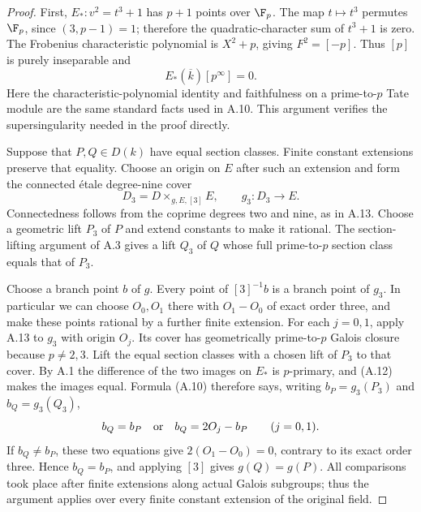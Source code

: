 \begin{proof}
First, $E_*:v^2=t^3+1$ has $p+1$ points over $\F_p$.
The map $t\mapsto t^3$ permutes $\F_p$, since $(3,p-1)=1$;
therefore the quadratic-character sum of $t^3+1$ is zero.
The Frobenius characteristic polynomial is $X^2+p$, giving
$F^2=[-p]$. Thus $[p]$ is purely inseparable and
\[
 E_*(\overline k)[p^\infty]=0.                                  \tag{A.12}
\]
Here the characteristic-polynomial identity and faithfulness
on a prime-to-$p$ Tate module are the same standard facts
used in A.10. This argument verifies the supersingularity
needed in the proof directly.

Suppose that $P,Q\in D(k)$ have equal section classes.
Finite constant extensions preserve that equality. Choose
an origin on $E$ after such an extension and form the
connected \'etale degree-nine cover
\[
 D_3=D\times_{g,E,[3]}E,
 \qquad g_3:D_3\to E.
\]
Connectedness follows from the coprime degrees two and nine,
as in A.13. Choose a geometric lift $P_3$ of $P$ and extend
constants to make it rational. The section-lifting argument
of A.3 gives a lift $Q_3$ of $Q$ whose full prime-to-$p$
section class equals that of $P_3$.

Choose a branch point $b$ of $g$. Every point of $[3]^{-1}b$
is a branch point of $g_3$. In particular we can choose
$O_0,O_1$ there with $O_1-O_0$ of exact order three, and
make these points rational by a further finite extension.
For each $j=0,1$, apply A.13 to $g_3$ with origin $O_j$.
Its cover has geometrically prime-to-$p$ Galois closure
because $p\ne2,3$. Lift the equal section classes with a
chosen lift of $P_3$ to that cover. By A.1 the difference
of the two images on $E_*$ is $p$-primary, and (A.12) makes
the images equal. Formula (A.10) therefore says, writing
$b_P=g_3(P_3)$ and $b_Q=g_3(Q_3)$,
\[
 b_Q=b_P\quad\hbox{or}\quad b_Q=2O_j-b_P
 \qquad(j=0,1).
\]
If $b_Q\ne b_P$, these two equations give
$2(O_1-O_0)=0$, contrary to its exact order three.
Hence $b_Q=b_P$, and applying $[3]$ gives $g(Q)=g(P)$.
All comparisons took place after finite extensions along
actual Galois subgroups; thus the argument applies over
every finite constant extension of the original field.
\end{proof}

